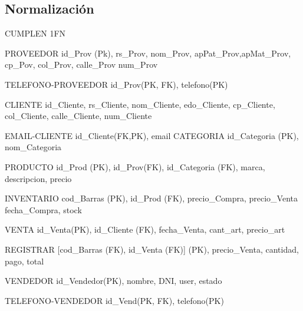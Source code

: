 \documentclass[30pt,fleqn]{article}
\begin{document}
\subsection{Normalización}
\vspace{10mm} %

CUMPLEN 1FN
\vspace{10mm} %

 PROVEEDOR {id_Prov (Pk), rs_Prov, nom_Prov, apPat_Prov,apMat_Prov, cp_Pov, col_Prov, calle_Prov num_Prov}
 
 \vspace{10mm} %
 
TELEFONO-PROVEEDOR {id_Prov(PK, FK), telefono(PK) } 

\vspace{10mm} %

CLIENTE{ id_Cliente, rs_Cliente, nom_Cliente, edo_Cliente, cp_Cliente, col_Cliente, calle_Cliente, num_Cliente}

\vspace{10mm} %

EMAIL-CLIENTE {id_Cliente(FK,PK), email} 
CATEGORIA {id_Categoria (PK), nom_Categoria}

\vspace{10mm} %

PRODUCTO {id_Prod (PK), id_Prov(FK), id_Categoria (FK), marca, descripcion, precio}

\vspace{10mm} %

INVENTARIO { cod_Barras (PK), id_Prod (FK), precio_Compra, precio_Venta fecha_Compra, stock} 

\vspace{10mm} %

VENTA {id_Venta(PK), id_Cliente (FK), fecha_Venta, cant_art, precio_art}

\vspace{10mm} %

REGISTRAR {[cod_Barras (FK), id_Venta (FK)] (PK), precio_Venta, cantidad, pago, total}

\vspace{10mm} %

VENDEDOR {id_Vendedor(PK), nombre, DNI, user, estado}

 \vspace{10mm} %
 
TELEFONO-VENDEDOR {id_Vend(PK, FK), telefono(PK) } 
\end{document}
